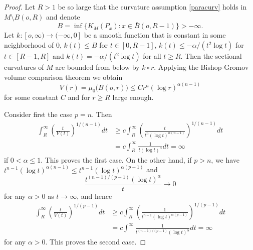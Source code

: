 \documentclass[10pt,a4paper,reqno]{amsart}
\numberwithin{equation}{section}
\theoremstyle{plain}
\theoremstyle{definition}
\begin{document}
\begin{proof}
 Let $R>1$ be so large that the curvature assumption \eqref{paracurv} holds in $M\setminus B(o,R)$
 and denote
  \[
    B = \inf \big\{K_M(P_x) \colon x \in \bar B(o,R-1)\big\} > -\infty.
  \]
Let $k\colon[o,\infty) \to (-\infty,0]$ be a smooth function that is constant in some neighborhood of $0$,
$k(t)\le B$ for $t\in [0,R-1]$, $k(t) \le -\alpha/(t^2\log t)$ for $t\in [R-1,R]$ and $k(t)= -\alpha/(t^2\log t)$
for all $t\ge R$. Then the sectional curvatures of $M$ are bounded from below by $k\circ r$.
Applying the Bishop-Gromov volume comparison theorem 
we obtain
  \[
V(r)= \mu_0 \big(B(o,r)\big) \le C r^n (\log r)^{\alpha(n-1)}
  \]
for some constant $C$ and for $r\ge R$ large enough.
  
Consider first the case $p=n$. Then 
  \begin{align*}
   \int_R^\infty \left( \frac{t}{V(t)} \right)^{1/(n-1)} dt 
   &\ge c\int_R^\infty \left( \frac{t}{t^n (\log t)^{\alpha(n-1)}} \right)^{1/(n-1)} dt \\
   &= c\int_R^\infty  \frac{1}{t (\log t)^{\alpha}}  dt = \infty
  \end{align*}
if $0<\alpha \le 1$. This proves the first case. On the other hand, if $p>n$, we have
$t^{n-1}(\log t)^{\alpha(n-1)} \le t^{n-1}(\log t)^{\alpha(p-1)}$ and
    \[
     \frac{t^{(n-1)/(p-1)}(\log t)^{\alpha}}{t} \longrightarrow 0
    \]
for any $\alpha > 0$ as $t\to\infty$, and hence
    \begin{align*}
     \int_R^\infty \left( \frac{t}{V(t)} \right)^{1/(p-1)} dt &\ge
     c\int_R^\infty \left( \frac{1}{t^{n-1}(\log t)^{\alpha(p-1)}} \right)^{1/(p-1)} dt \\
     &= c\int^\infty \frac{1}{t^{(n-1)/(p-1)}(\log t)^{\alpha}}  dt = \infty
    \end{align*}
for any $\alpha >0$. This proves the second case.  
  \end{proof}


\end{document}
